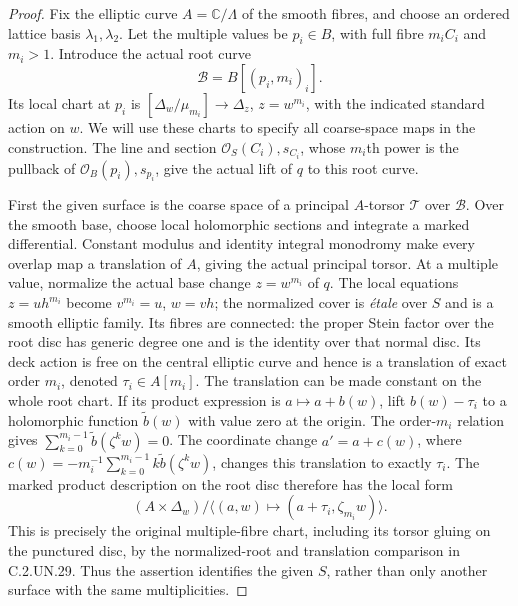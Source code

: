 \begin{proof}
Fix the elliptic curve $A=\mathbb C/\Lambda$ of
the smooth fibres, and choose an ordered lattice
basis $\lambda_1,\lambda_2$. Let the multiple
values be $p_i\in B$, with full fibre
$m_iC_i$ and $m_i>1$. Introduce the actual root
curve
\[
                 \mathcal B=B[(p_i,m_i)_i].
                                                               \tag{C.SF.1}
\]
Its local chart at $p_i$ is
$[\Delta_w/\mu_{m_i}]\to\Delta_z$,
$z=w^{m_i}$, with the indicated standard action
on $w$. We will use these charts to specify
all coarse-space maps in the construction.
The line and section $\mathcal O_S(C_i),s_{C_i}$,
whose $m_i$th power is the pullback of
$\mathcal O_B(p_i),s_{p_i}$, give the actual
lift of $q$ to this root curve.

First the given surface is the coarse space
of a principal $A$-torsor $\mathcal T$ over
$\mathcal B$. Over the smooth base, choose
local holomorphic sections and integrate a
marked differential. Constant modulus and
identity integral monodromy make every
overlap map a translation of $A$, giving
the actual principal torsor. At a multiple
value, normalize the actual base change
$z=w^{m_i}$ of $q$. The local equations
$z=u h^{m_i}$ become $v^{m_i}=u$, $w=vh$;
the normalized cover is \emph{\'etale} over
$S$ and is a smooth elliptic family. Its
fibres are connected: the proper Stein
factor over the root disc has generic
degree one and is the identity over
that normal disc. Its
deck action is free on the central elliptic
curve and hence is a translation of exact
order $m_i$, denoted $\tau_i\in A[m_i]$.
The translation can be made constant
on the whole root chart. If its product
expression is $a\mapsto a+b(w)$, lift
$b(w)-\tau_i$ to a holomorphic function
$\widetilde b(w)$ with value zero at
the origin. The order-$m_i$ relation
gives $\sum_{k=0}^{m_i-1}\widetilde b(\zeta^kw)=0$.
The coordinate change $a'=a+c(w)$, where
$c(w)=-m_i^{-1}\sum_{k=0}^{m_i-1}
 k\widetilde b(\zeta^kw)$, changes this
translation to exactly $\tau_i$.
The marked product description on the root
disc therefore has the local form
\[
 (A\times\Delta_w)/
 \langle(a,w)\mapsto(a+\tau_i,\zeta_{m_i}w)\rangle.
                                                               \tag{C.SF.2}
\]
This is precisely the original multiple-fibre
chart, including its torsor gluing on the
punctured disc, by the normalized-root and
translation comparison in C.2.UN.29.
Thus the assertion identifies the given
$S$, rather than only another surface with
the same multiplicities.


\end{proof}
